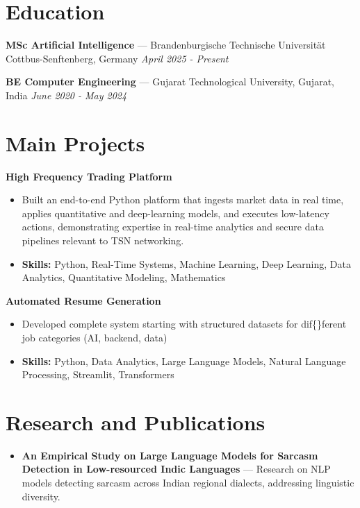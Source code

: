 \documentclass[a4paper,10pt]{article}
\begin{document}
\section*{Education}
\textbf{MSc Artificial Intelligence} — Brandenburgische Technische Universität Cottbus-Senftenberg, Germany \hfill \textit{April 2025 - Present}\par
\vspace{1.5pt}
\textbf{BE Computer Engineering} — Gujarat Technological University, Gujarat, India \hfill \textit{June 2020 - May 2024}\par

\section*{Main Projects}
\textbf{High Frequency Trading Platform}\par
\vspace{1pt}
\begin{itemize}
  \item Built an end-to-end Python platform that ingests market data in real time, applies quantitative and deep-learning models, and executes low-latency actions, demonstrating expertise in real-time analytics and secure data pipelines relevant to TSN networking.
  \item \textbf{Skills:} Python, Real-Time Systems, Machine Learning, Deep Learning, Data Analytics, Quantitative Modeling, Mathematics
\end{itemize}
\vspace{3pt}
\textbf{Automated Resume Generation}\par
\vspace{1pt}
\begin{itemize}
  \item Developed complete system starting with structured datasets for dif\{\}ferent job categories (AI, backend, data)
  \item \textbf{Skills:} Python, Data Analytics, Large Language Models, Natural Language Processing, Streamlit, Transformers
\end{itemize}

\section*{Research and Publications}
\begin{itemize}
\item \textbf{An Empirical Study on Large Language Models for Sarcasm Detection in Low-resourced Indic Languages} — Research on NLP models detecting sarcasm across Indian regional dialects, addressing linguistic diversity.
\end{itemize}
\end{document}
